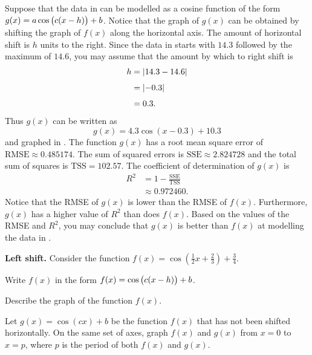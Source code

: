\documentclass[a4paper,oneside,12pt]{article}
\begin{document}
{\begin{solution}
Suppose that the data in 
can be modelled as a cosine function of the form
$g(x) = a \cos\big(c (x - h)\big) + b$.  Notice that the graph of
$g(x)$ can be obtained by shifting the graph of $f(x)$ along the
horizontal axis.  The amount of horizontal shift is $h$ units to the
right.  Since the data in
 starts with $14.3$
followed by the maximum of $14.6$, you may assume that the amount by
which to right shift is
\begin{align*}
h
&=
\lvert14.3 - 14.6\rvert \\[4pt]
&=
\lvert-0.3\rvert \\[4pt]
&=
0.3.
\end{align*}
Thus $g(x)$ can be written as
\begin{equation}
\label{eqn:trigonometric:mean_min_temperature_cos_right_shift}
g(x)
=
4.3 \cos(x - 0.3) + 10.3
\end{equation}
and graphed in .  The
function $g(x)$ has a root mean square error of
$\text{RMSE} \approx 0.485174$.  The sum of squared errors is
$\text{SSE} \approx 2.824728$ and the total sum of squares is
$\text{TSS} = 102.57$.  The coefficient of determination of $g(x)$ is
\begin{align*}
R^2
&=
1 - \frac{\text{SSE}}{\text{TSS}} \\[4pt]
&\approx
0.972460.
\end{align*}
Notice that the RMSE of $g(x)$ is lower than the RMSE of $f(x)$.
Furthermore, $g(x)$ has a higher value of $R^2$ than does $f(x)$.
Based on the values of the RMSE and $R^2$, you may conclude that
$g(x)$ is better than $f(x)$ at modelling the data in
.
\end{solution}
}{}

\begin{example}
\textbf{Left shift.}
Consider the function
$f(x) = \cos(\frac{1}{2} x + \frac{2}{3}) + \frac{3}{4}$.
\begin{packedenum}
\item\label{subeg:trigonometric:cos_left_shift_4third_standard_form}
  Write $f(x)$ in the form $f(x) = \cos\big(c(x - h)\big) + b$.

\item\label{subeg:trigonometric:cos_left_shift_4third_describe}
  Describe the graph of the function $f(x)$.

\item\label{subeg:trigonometric:cos_left_shift_4third_graph}
  Let $g(x) = \cos(cx) + b$ be the function $f(x)$ that has not been
  shifted horizontally.  On the same set of axes, graph $f(x)$ and
  $g(x)$ from $x = 0$ to $x = p$, where $p$ is the period of both
  $f(x)$ and $g(x)$.
\end{packedenum}
\end{example}
\end{document}
